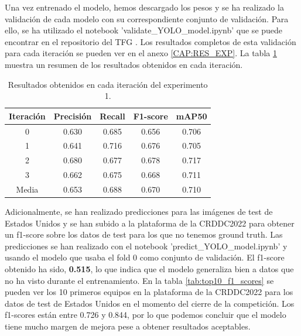 Una vez entrenado el modelo, hemos descargado los pesos y se ha realizado la validación de cada modelo con su correspondiente conjunto de validación. Para ello, se ha utilizado el notebook 'validate\_YOLO\_model.ipynb' que se puede encontrar en el repositorio del TFG \cite{TFG_Repository}. Los resultados completos de esta validación para cada iteración se pueden ver en el anexo \ref{CAP:RES_EXP}. La tabla \ref{tab:exp1_results} muestra un resumen de los resultados obtenidos en cada iteración.

\begin{table}[H]
    \centering
    \begin{tabular}{|c|c|c|c|c|}
        \hline
        \textbf{Iteración} & \textbf{Precisión} & \textbf{Recall} & \textbf{F1-score} & \textbf{mAP50} \\ \hline
        0       & 0.630 & 0.685 & 0.656 & 0.706 \\ \hline
        1       & 0.641 & 0.716 & 0.676 & 0.705 \\ \hline
        2       & 0.680 & 0.677 & 0.678 & 0.717 \\ \hline
        3       & 0.662 & 0.675 & 0.668 & 0.711 \\ \hline
        Media   & 0.653 & 0.688 & 0.670 & 0.710 \\ \hline
    \end{tabular}
    \caption{Resultados obtenidos en cada iteración del experimento 1.}
    \label{tab:exp1_results}
\end{table}

Adicionalmente, se han realizado predicciones para las imágenes de test de Estados Unidos y se han subido a la plataforma de la CRDDC2022 para obtener un f1-score sobre los datos de test para los que no tenemos ground truth. Las predicciones se han realizado con el notebook 'predict\_YOLO\_model.ipynb' y usando el modelo que usaba el fold 0 como conjunto de validación. El f1-score obtenido ha sido, \textbf{0.515}, lo que indica que el modelo generaliza bien a datos que no ha visto durante el entrenamiento. En la tabla \ref{tab:top10_f1_scores} se pueden ver los 10 primeros equipos en la plataforma de la CRDDC2022 para los datos de test de Estados Unidos en el momento del cierre de la competición. Los f1-scores están entre 0.726 y 0.844, por lo que podemos concluir que el modelo tiene mucho margen de mejora pese a obtener resultados aceptables.

